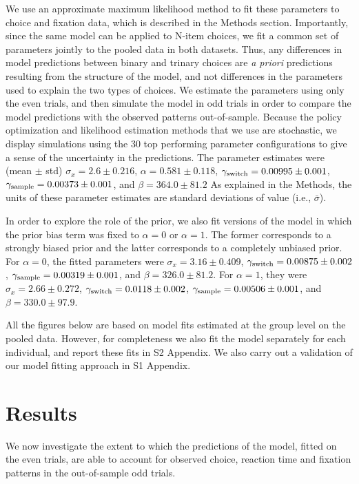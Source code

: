 We use an approximate maximum likelihood method to fit these parameters to choice and fixation data, which is described in the Methods section. Importantly, since the same model can be applied to N-item choices, we fit a common set of parameters jointly to the pooled data in both datasets. Thus, any differences in model predictions between binary and trinary choices are \emph{a priori} predictions resulting from the structure of the model, and not differences in the parameters used to explain the two types of choices. We estimate the parameters using only the even trials, and then simulate the model in odd trials in order to compare the model predictions with the observed patterns out-of-sample. Because the policy optimization and likelihood estimation methods that we use are stochastic, we display simulations using the 30 top performing parameter configurations to give a sense of the uncertainty in the predictions. The parameter estimates were (mean $\pm$ std) 
$\sigma_x = 2.6 \pm 0.216$,
$\alpha = 0.581 \pm 0.118$,
$\gamma_\text{switch} =  0.00995 \pm 0.001$,
$\gamma_\text{sample} = 0.00373 \pm 0.001$, and
$\beta = 364.0 \pm 81.2$
As explained in the Methods, the units of these parameter estimates are standard deviations of value (i.e., $\bar{\sigma}$).


In order to explore the role of the prior, we also fit versions of the model in which the prior bias term was fixed to $\alpha = 0$ or $\alpha = 1$. The former corresponds to a strongly biased prior and the latter corresponds to a completely unbiased prior. For $\alpha = 0$, the fitted parameters were
$\sigma_x = 3.16 \pm 0.409$,
$\gamma_\text{switch} =  0.00875 \pm 0.002$,
$\gamma_\text{sample} = 0.00319 \pm 0.001$, and
$\beta = 326.0 \pm 81.2$.
For $\alpha = 1$, they were
$\sigma_x = 2.66 \pm 0.272$,
$\gamma_\text{switch} =   0.0118 \pm 0.002$,
$\gamma_\text{sample} = 0.00506 \pm 0.001$, and
$\beta = 330.0 \pm 97.9$.


All the figures below are based on model fits estimated at the group level on the pooled data. However, for completeness we also fit the model separately for each individual, and report these fits in S2 Appendix. We also carry out a validation of our model fitting approach in S1 Appendix.

 
\section{Results}

We now investigate the extent to which the predictions of the model, fitted on the even trials, are able to account for observed choice, reaction time and fixation patterns in the out-of-sample odd trials.

